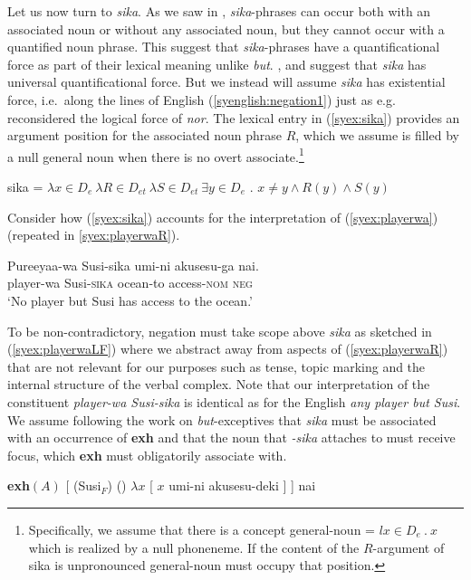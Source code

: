 \documentclass[output=paper]{langscibook}
\begin{document}
Let us now turn to \emph{sika}.  As we saw in , \emph{sika}-phrases can occur both with an associated noun or without any associated noun, but they cannot occur with a quantified noun phrase.
This suggest that \emph{sika}-phrases have a quantificational force as part of their lexical meaning unlike \emph{but}.
\citet{alonso-ovalle04a}, \citet{kawahara08a} and \citet{yoshimura2007b} suggest that \emph{sika} has universal quantificational force.
But we instead will assume \emph{sika} has existential force, i.e.\ along the lines of English (\ref{syenglish:negation1}) just as e.g.\ \citet{wurmbrand08b} reconsidered the logical force of \emph{nor}.
The lexical entry in (\ref{syex:sika}) provides an argument position for the associated noun phrase $R$, which we assume is filled by a null general noun when there is no overt associate.\footnote{Specifically, we assume that there is a concept \textsf{general-noun} = $l x \in D_e\ .\ x$ which is realized by a null phoneneme.  If the content of the $R$-argument of \textsf{sika} is unpronounced \textsf{general-noun} must occupy that position.}

\ea \label{syex:sika} 
   \textsf{sika} = $\lambda x \in D_e\ \lambda R \in D_{et}\ \lambda S \in D_{et}\ \exists y \in D_e$ . $x \neq y \land R(y) \land S(y)$\z

Consider how (\ref{syex:sika}) accounts for the interpretation of (\ref{syex:playerwa}) (repeated in \ref{syex:playerwaR}).

\ea \label{syex:playerwaR}
\gll Pureeyaa-wa Susi-sika umi-ni akusesu-ga nai.\\
player-wa Susi-\textsc{sika} ocean-{to} access-\textsc{nom} \textsc{neg}\\
\glt `No player but Susi  has access to the ocean.'\z

To be non-contradictory, negation must take scope above \emph{sika} as sketched in (\ref{syex:playerwaLF}) where we abstract away from  aspects of (\ref{syex:playerwaR}) that are not relevant for our purposes such as tense,  topic marking and the internal structure of the verbal complex.
Note that our interpretation of the constituent \emph{player-wa Susi-sika} is identical as for the English \emph{any player but Susi}.
We assume following the work on \emph{but}-exceptives that \emph{sika} must be associated with an occurrence of \textbf{exh} and that the noun that \emph{-sika} attaches to must receive focus, which \textbf{exh} must obligatorily associate with.

\ea \label{syex:playerwaLF}
    \textbf{exh}$(A)$ [   (Susi$_F$) () $\lambda x$ [ $x$ umi-ni akusesu-deki ] ] nai \z
\end{document}
